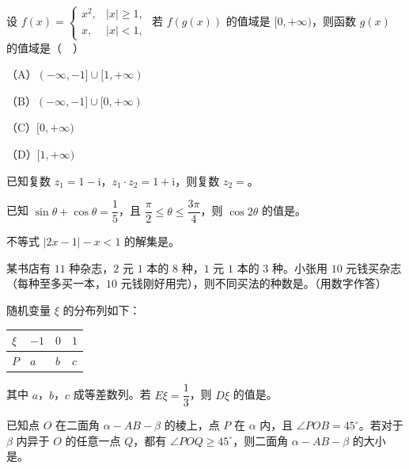 \begin{question}
设 $f(x)=\begin{cases}x^2,&|x|\geqslant1,\\ x,&|x|<1,\end{cases}$ 若 $f(g(x))$ 的值域是 $[0,+\infty)$，则函数 $g(x)$ 的值域是（　）

（A）$(-\infty,-1]\cup[1,+\infty)$

（B）$(-\infty,-1]\cup[0,+\infty)$

（C）$[0,+\infty)$

（D）$[1,+\infty)$

\end{question}

\begin{question}
已知复数 $z_1=1-\mathrm i$，$z_1\cdot z_2=1+\mathrm i$，则复数 $z_2=$\gkblank{}。

\end{question}
\begin{question}
已知 $\sin\theta+\cos\theta=\dfrac15$，且 $\dfrac{\pi}{2}\leqslant\theta\leqslant\dfrac{3\pi}{4}$，则 $\cos2\theta$ 的值是\gkblank{}。

\end{question}
\begin{question}
不等式 $|2x-1|-x<1$ 的解集是\gkblank{}。

\end{question}
\begin{question}
某书店有 $11$ 种杂志，$2$ 元 $1$ 本的 $8$ 种，$1$ 元 $1$ 本的 $3$ 种。小张用 $10$ 元钱买杂志（每种至多买一本，$10$ 元钱刚好用完），则不同买法的种数是\gkblank{}。（用数字作答）

\end{question}
\begin{question}
随机变量 $\xi$ 的分布列如下：

\begin{center}
\begin{tabular}{llll}
\toprule
$\xi$ & $-1$ & $0$ & $1$ \\
\midrule
$P$ & $a$ & $b$ & $c$ \\
\bottomrule
\end{tabular}
\end{center}

其中 $a$，$b$，$c$ 成等差数列。若 $E\xi=\dfrac13$，则 $D\xi$ 的值是\gkblank{}。

\end{question}
\begin{question}
已知点 $O$ 在二面角 $\alpha-AB-\beta$ 的棱上，点 $P$ 在 $\alpha$ 内，且 $\angle POB=45^\circ$。若对于 $\beta$ 内异于 $O$ 的任意一点 $Q$，都有 $\angle POQ\geqslant45^\circ$，则二面角 $\alpha-AB-\beta$ 的大小是\gkblank{}。

\end{question}

